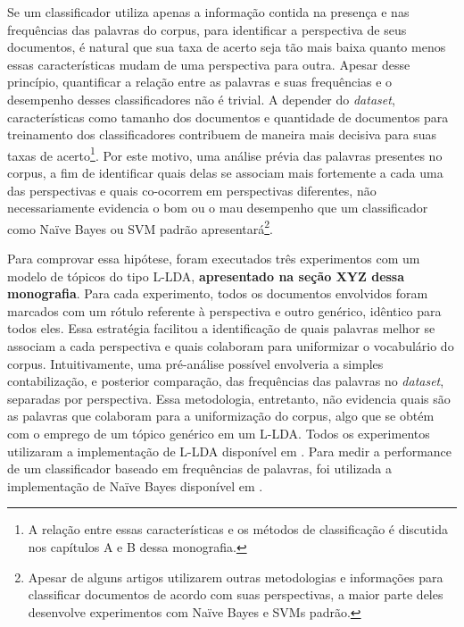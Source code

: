 Se um classificador utiliza apenas a informação contida na presença e nas frequências das palavras do corpus, para identificar a perspectiva de seus documentos, é natural que sua taxa de acerto seja tão mais baixa quanto menos essas características mudam de uma perspectiva para outra. Apesar desse princípio, quantificar a relação entre as palavras e suas frequências e o desempenho desses classificadores não é trivial. A depender do \emph{dataset}, características como tamanho dos documentos e quantidade de documentos para treinamento dos classificadores contribuem de maneira mais decisiva para suas taxas de acerto\footnote{A relação entre essas características e os métodos de classificação é discutida nos capítulos A e B dessa monografia.}. Por este motivo, uma análise prévia das palavras presentes no corpus, a fim de identificar quais delas se associam mais fortemente a cada uma das perspectivas e quais co-ocorrem em perspectivas diferentes, não necessariamente evidencia o bom ou o mau desempenho que um classificador como Naïve Bayes ou SVM padrão apresentará\footnote{Apesar de alguns artigos utilizarem outras metodologias e informações para classificar documentos de acordo com suas perspectivas, a maior parte deles desenvolve experimentos com Naïve Bayes e SVMs padrão.}.

Para comprovar essa hipótese, foram executados três experimentos com um modelo de tópicos do tipo L-LDA, \textbf{apresentado na seção XYZ dessa monografia}. Para cada experimento, todos os documentos envolvidos foram marcados com um rótulo referente à perspectiva e outro genérico, idêntico para todos eles. Essa estratégia facilitou a identificação de quais palavras melhor se associam a cada perspectiva e quais colaboram para uniformizar o vocabulário do corpus. Intuitivamente, uma pré-análise possível envolveria a simples contabilização, e posterior comparação, das frequências das palavras no \emph{dataset}, separadas por perspectiva. Essa metodologia, entretanto, não evidencia quais são as palavras que colaboram para a uniformização do corpus, algo que se obtém com o emprego de um tópico genérico em um L-LDA. Todos os experimentos utilizaram a implementação de L-LDA disponível em \cite{top-llda}. Para medir a performance de um classificador baseado em frequências de palavras, foi utilizada a implementação de Naïve Bayes disponível em \cite{alibezz-naive-bayes}. 

